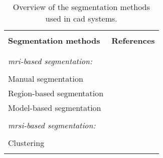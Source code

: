 \begin{table}
  \caption{Overview of the segmentation methods used in \ac{cad} systems.}\label{tab:seg}
  \small
  \renewcommand{\arraystretch}{.8}
  \begin{tabular}{p{.65\linewidth} p{.25\linewidth}}
    \hline \\ [-1.5ex]
    \textbf{Segmentation methods} & \textbf{References} \\ \\ [-1.5ex]
    \hline \\ [-1.5ex]
    \textit{\ac{mri}-based segmentation:} & \\ \\ [-1.5ex]
    \quad Manual segmentation & \cite{Artan2009,Artan2010,Matulewicz2013,Niaf2011,Niaf2012,Ozer2009,Ozer2010,Puech2009,Vos2008,Vos2008a,Vos2010,Vos2012} \\
    \quad Region-based segmentation & \cite{Litjens2012,Litjens2014} \\
    \quad Model-based segmentation & \cite{Litjens2011,Viswanath2008a,Viswanath2009,Viswanath2011,Vos2012} \\ \\ [-1.5ex]
    \textit{\ac{mrsi}-based segmentation:} & \\ \\ [-1.5ex]
    \quad Clustering & \cite{Tiwari2009} \\ \\ [-1.5ex]
    \hline
  \end{tabular}
\end{table}

